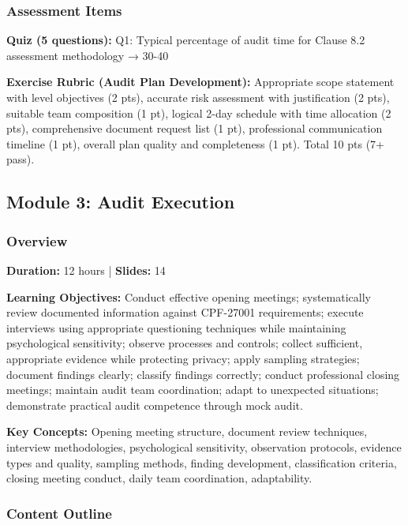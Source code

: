 \documentclass[11pt,a4paper]{article}
\begin{document}
\subsubsection{Assessment Items}
\textbf{Quiz (5 questions):} Q1: Typical percentage of audit time for Clause 8.2 assessment methodology → 30-40%

\textbf{Exercise Rubric (Audit Plan Development):} Appropriate scope statement with level objectives (2 pts), accurate risk assessment with justification (2 pts), suitable team composition (1 pt), logical 2-day schedule with time allocation (2 pts), comprehensive document request list (1 pt), professional communication timeline (1 pt), overall plan quality and completeness (1 pt). Total 10 pts (7+ pass).

\subsection{Module 3: Audit Execution}

\subsubsection{Overview}
\textbf{Duration:} 12 hours | \textbf{Slides:} 14

\textbf{Learning Objectives:} Conduct effective opening meetings; systematically review documented information against CPF-27001 requirements; execute interviews using appropriate questioning techniques while maintaining psychological sensitivity; observe processes and controls; collect sufficient, appropriate evidence while protecting privacy; apply sampling strategies; document findings clearly; classify findings correctly; conduct professional closing meetings; maintain audit team coordination; adapt to unexpected situations; demonstrate practical audit competence through mock audit.

\textbf{Key Concepts:} Opening meeting structure, document review techniques, interview methodologies, psychological sensitivity, observation protocols, evidence types and quality, sampling methods, finding development, classification criteria, closing meeting conduct, daily team coordination, adaptability.

\subsubsection{Content Outline}
\end{document}

